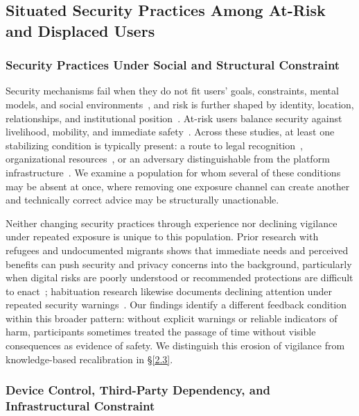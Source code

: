 \documentclass[conference,compsoc]{IEEEtran}
\begin{document}
\subsection{Situated Security Practices Among At-Risk and Displaced Users}
\label{2.2}

\subsubsection{Security Practices Under Social and Structural Constraint}

Security mechanisms fail when they do not fit users' goals, constraints, mental models, and social environments~\cite{whitten1999johnny,adams1999users}, and risk is further shaped by identity, location, relationships, and institutional position~\cite{warford2022sok}. At-risk users balance security against livelihood, mobility, and immediate safety~\cite{simko2018computer,mcgregor2017weakest,tran2024security, daffalla2021defensive, slupska2022they}. Across these studies, at least one stabilizing condition is typically present: a route to legal recognition~\cite{simko2018computer,tran2024security}, organizational resources~\cite{mcgregor2017weakest}, or an adversary distinguishable from the platform infrastructure~\cite{freed2017digital,matthews2017stories,tseng2022care}. We examine a population for whom several of these conditions may be absent at once, where removing one exposure channel can create another and technically correct advice may be structurally unactionable.

Neither changing security practices through experience nor declining vigilance under repeated exposure is unique to this population. Prior research with refugees and undocumented migrants shows that immediate needs and perceived benefits can push security and privacy concerns into the background, particularly when digital risks are poorly understood or recommended protections are difficult to enact~\cite{simko2018computer,tran2024security,guberek2018keeping}; habituation research likewise documents declining attention under repeated security warnings~\cite{vance2018tuning}. Our findings identify a different feedback condition within this broader pattern: without explicit warnings or reliable indicators of harm, participants sometimes treated the passage of time without visible consequences as evidence of safety. We distinguish this erosion of vigilance from knowledge-based recalibration in \S\ref{2.3}.

\subsubsection{Device Control, Third-Party Dependency, and Infrastructural Constraint}
\end{document}
